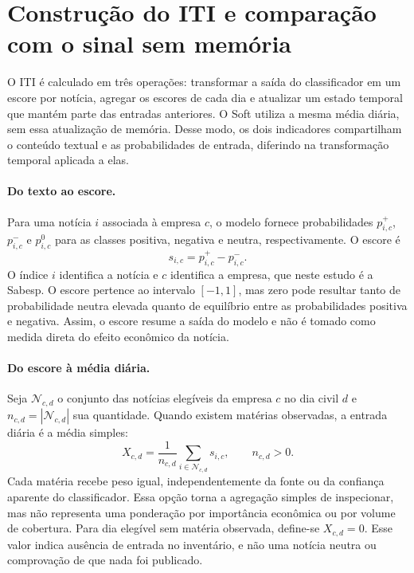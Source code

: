 \section{Construção do ITI e comparação com o sinal sem memória}
\label{sec:formulacao-iti}

O ITI é calculado em três operações: transformar a saída do classificador em um escore por notícia, agregar os escores de cada dia e atualizar um estado temporal que mantém parte das entradas anteriores. O Soft utiliza a mesma média diária, sem essa atualização de memória. Desse modo, os dois indicadores compartilham o conteúdo textual e as probabilidades de entrada, diferindo na transformação temporal aplicada a elas.

\paragraph{Do texto ao escore.}
Para uma notícia $i$ associada à empresa $c$, o modelo fornece probabilidades $p^+_{i,c}$, $p^-_{i,c}$ e $p^0_{i,c}$ para as classes positiva, negativa e neutra, respectivamente. O escore é
\begin{equation}
    s_{i,c}=p^+_{i,c}-p^-_{i,c}.
    \label{eq:iti-escore}
\end{equation}
O índice $i$ identifica a notícia e $c$ identifica a empresa, que neste estudo é a Sabesp. O escore pertence ao intervalo $[-1,1]$, mas zero pode resultar tanto de probabilidade neutra elevada quanto de equilíbrio entre as probabilidades positiva e negativa. Assim, o escore resume a saída do modelo e não é tomado como medida direta do efeito econômico da notícia.

\paragraph{Do escore à média diária.}
Seja $\mathcal{N}_{c,d}$ o conjunto das notícias elegíveis da empresa $c$ no dia civil $d$ e $n_{c,d}=|\mathcal{N}_{c,d}|$ sua quantidade. Quando existem matérias observadas, a entrada diária é a média simples:
\begin{equation}
    X_{c,d}=\frac{1}{n_{c,d}}\sum_{i\in\mathcal{N}_{c,d}}s_{i,c},\qquad n_{c,d}>0.
    \label{eq:iti-entrada-diaria}
\end{equation}
Cada matéria recebe peso igual, independentemente da fonte ou da confiança aparente do classificador. Essa opção torna a agregação simples de inspecionar, mas não representa uma ponderação por importância econômica ou por volume de cobertura. Para dia elegível sem matéria observada, define-se $X_{c,d}=0$. Esse valor indica ausência de entrada no inventário, e não uma notícia neutra ou comprovação de que nada foi publicado.


